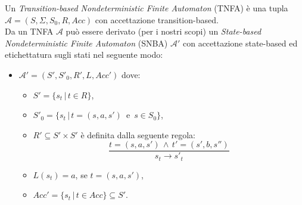 \documentclass{article}
\begin{document}
    Un \textit{Transition-based Nondeterministic Finite Automaton} (TNFA) è una tupla $\mathcal{A}=(S,\Sigma,S_0,R,Acc)$ con accettazione transition-based.
    \vspace{0.25cm}\\
    Da un TNFA $\mathcal{A}$ può essere derivato (per i nostri scopi) un \textit{State-based Nondeterministic Finite Automaton} (SNBA) $\mathcal{A'}$ con accettazione state-based ed etichettatura sugli stati nel seguente modo:
    \begin{itemize}

        \item $\mathcal{A}' = (S',S'_0,R',L, Acc')$ dove:
        \begin{itemize}
            \item $S' = \{s_t\,|\,t\in R\}$,
            \item $S'_0 = \{s_t\,|\,t=(s,a,s')\,\text{ e }\,s \in S_0\}$,
            \item $R' \subseteq S' \times S'$ è definita dalla seguente regola:
            \[
                \frac{
                    t=(s,a,s')\,\land\, t'=(s',b,s'')
                }
                {
                    s_t \longrightarrow s'_t
                }
            \]
            \item $L(s_t) = a$, se $t=(s,a,s')$,
            \item $Acc' = \{s_t\,|\,t\in Acc\}\subseteq S'$.
        \end{itemize}
    \end{itemize}
\end{document}
